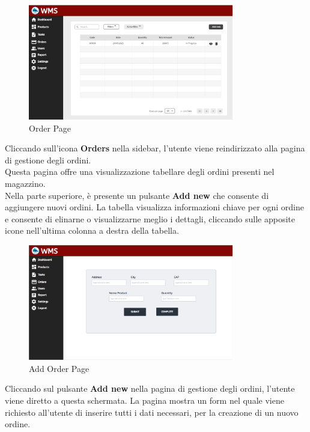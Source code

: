 \begin{figure}[H]
    \centering
    \includegraphics[width=0.8\textwidth]{document/sections/img/orderPage.png}
    \caption{Order Page}
    \label{fig:orderPage}
\end{figure}

Cliccando sull'icona \textbf{Orders} nella sidebar, l'utente viene reindirizzato alla pagina di gestione degli ordini.\\
Questa pagina offre una visualizzazione tabellare degli ordini presenti nel magazzino.\\
Nella parte superiore, è presente un pulsante \textbf{Add new} che consente di aggiungere nuovi ordini.
La tabella visualizza informazioni chiave per ogni ordine e consente di elinarne o visualizzarne meglio i dettagli,
cliccando sulle apposite icone nell'ultima colonna a destra della tabella.

\begin{figure}[H]
    \centering
    \includegraphics[width=0.8\textwidth]{document/sections/img/AddOrder.png}
    \caption{Add Order Page}
    \label{fig:addOrderPage}
\end{figure}
Cliccando sul pulsante \textbf{Add new} nella pagina di gestione degli ordini,
l'utente viene diretto a questa schermata.
La pagina mostra un form nel quale viene richiesto all'utente di inserire tutti i dati necessari,
per la creazione di un nuovo ordine.

